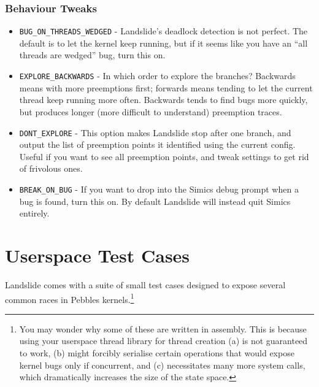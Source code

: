 \documentclass{article}
\begin{document}
\subsubsection{Behaviour Tweaks}
\begin{itemize}
	\item \texttt{BUG\_ON\_THREADS\_WEDGED} - Landslide's deadlock detection is not perfect. The default is to let the kernel keep running, but if it seems like you have an ``all threads are wedged'' bug, turn this on.
	\item \texttt{EXPLORE\_BACKWARDS} - In which order to explore the branches? Backwards means with more preemptions first; forwards means tending to let the current thread keep running more often. Backwards tends to find bugs more quickly, but produces longer (more difficult to understand) preemption traces.
	\item \texttt{DONT\_EXPLORE} - This option makes Landslide stop after one branch, and output the list of preemption points it identified using the current config. Useful if you want to see all preemption points, and tweak settings to get rid of frivolous ones.
	\item \texttt{BREAK\_ON\_BUG} - If you want to drop into the Simics debug prompt when a bug is found, turn this on. By default Landslide will instead quit Simics entirely.
\end{itemize}

\section{Userspace Test Cases}
\label{sec:testcase}

Landslide comes with a suite of small test cases designed to expose several common races in Pebbles kernels.\footnote{You may wonder why some of these are written in assembly.
This is because using your userspace thread library for thread creation (a) is not guaranteed to work, (b) might forcibly serialise certain operations that would expose kernel bugs only if concurrent, and (c) necessitates many more system calls, which dramatically increases the size of the state space.}
\end{document}

